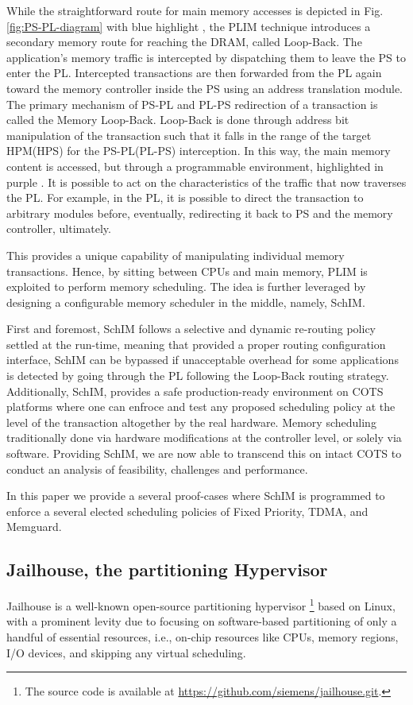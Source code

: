 While the straightforward route for main memory accesses is depicted in Fig. \ref{fig:PS-PL-diagram} with blue highlight , the PLIM technique introduces a secondary memory route for reaching the DRAM, called Loop-Back. The application's memory traffic is intercepted by dispatching them to leave the PS to enter the PL. Intercepted transactions are then forwarded from the PL again toward the memory controller inside the PS using an address translation module. The primary mechanism of PS-PL and PL-PS redirection of a transaction is called the Memory Loop-Back. Loop-Back is done through address bit manipulation of the transaction such that it falls in the range of the target HPM(HPS) for the PS-PL(PL-PS) interception. In this way, the main memory content is accessed, but through a programmable environment, highlighted in purple . It is possible to act on the characteristics of the traffic that now traverses the PL. For example, in the PL, it is possible to direct the transaction to arbitrary modules before, eventually, redirecting it back to PS and the memory controller, ultimately.

    This provides a unique capability of manipulating individual memory transactions. Hence, by sitting between CPUs and main memory, PLIM is exploited to perform memory scheduling. The idea is further leveraged by designing a configurable memory scheduler in the middle, namely, SchIM.


First and foremost, SchIM follows a selective and dynamic re-routing policy settled at the run-time, meaning that provided a proper routing configuration interface,  SchIM can be bypassed if unacceptable overhead for some applications is detected by going through the PL following the Loop-Back routing strategy. Additionally, SchIM, provides a safe production-ready environment on COTS platforms where one can enfroce and test any proposed scheduling policy at the level of the transaction altogether by the real hardware. Memory scheduling traditionally done via hardware modifications at the controller level, or solely via software. Providing SchIM, we are now able to transcend this on intact COTS to conduct an analysis of feasibility, challenges and performance. 


In this paper we provide a several proof-cases where SchIM is programmed to enforce a several elected scheduling policies of Fixed Priority, TDMA, and Memguard. 






\subsection{Jailhouse, the partitioning Hypervisor}
Jailhouse is a well-known open-source partitioning hypervisor \footnote{The source code is available at \url{https://github.com/siemens/jailhouse.git}.} based on Linux,
 with a prominent levity due to focusing on software-based partitioning of only a handful of essential resources, i.e., on-chip resources like CPUs, memory regions, I/O devices, and skipping any virtual scheduling.

